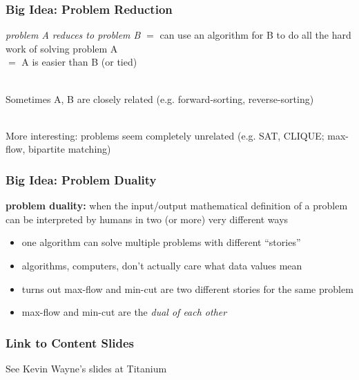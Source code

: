 \documentclass{beamer}
\newcommand{\stanza}{ \\~\ }
\begin{document}
\begin{frame} \frametitle{Big Idea: Problem Reduction}
\emph{problem A reduces to problem B} $=$ can use an algorithm for B to do all the hard
work of solving problem A \\
$=$ A is easier than B (or tied) \stanza

Sometimes A, B are closely related (e.g. forward-sorting, reverse-sorting) \stanza

More interesting: problems seem completely unrelated (e.g. SAT, CLIQUE;
max-flow, bipartite matching)
\end{frame}

\begin{frame} \frametitle{Big Idea: Problem Duality}
\textbf{problem duality:} when the input/output mathematical definition of a
problem can be interpreted by humans in two (or more) very different ways
\begin{itemize}
  \item one algorithm can solve multiple problems with different ``stories''
  \item algorithms, computers, don't actually care what data values mean
  \item turns out max-flow and min-cut are two different stories for the same problem
  \item max-flow and min-cut are the \emph{dual of each other}
\end{itemize}
\end{frame}


\begin{frame} \frametitle{Link to Content Slides}

See Kevin Wayne's slides at Titanium

\end{frame}
\end{document}
